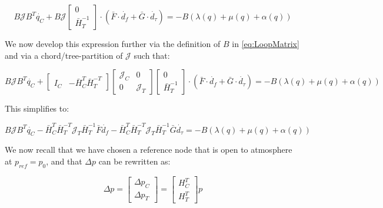 \begin{equation}\label{eq:PressureFunctionKirchKNL}
	B\mathcal{J}B^T\dot{q_C} + B \mathcal{J} 
	\begin{bmatrix} 0 \\ \bar{H}_T^{-1} \end{bmatrix} \cdot (\bar{F} \cdot \dot{d_f} + \bar{G} \cdot \dot{d_{\tau}})
	= -B(\lambda(q) + \mu(q) + \alpha(q))
\end{equation}

We now develop this expression further via the definition of $B$ in \cref{eq:LoopMatrix} and via a chord/tree-partition of $\mathcal{J}$ such that:

\begin{equation}\label{eq:PressureFunctionKirchJPartitions}
	B\mathcal{J}B^T\dot{q_C} + 
	\begin{bmatrix}		I_C & -\bar{H}_C^T\bar{H}_T^{-T}	\end{bmatrix} 
	\begin{bmatrix}		\mathcal{J}_C & 0 \\ 0 & \mathcal{J}_T	\end{bmatrix} 
	\begin{bmatrix} 0 \\ \bar{H}_T^{-1} \end{bmatrix} \cdot (\bar{F} \cdot \dot{d_f} + \bar{G} \cdot \dot{d_{\tau}})
	= -B(\lambda(q) + \mu(q) + \alpha(q))
\end{equation}

This simplifies to:

\begin{equation}\label{eq:PressureFunctionKirchJPartitionsSimp} %
	B\mathcal{J}B^T\dot{q_C} 
	-\bar{H}_C^T\bar{H}_T^{-T}\mathcal{J}_T\bar{H}_T^{-1} \bar{F} \dot{d_f} 
	-\bar{H}_C^T\bar{H}_T^{-T}\mathcal{J}_T\bar{H}_T^{-1} \bar{G} \dot{d_{\tau}}
	= -B(\lambda(q) + \mu(q) + \alpha(q))
\end{equation}

We now recall that we have chosen a reference node that is open to atmosphere at $p_{ref} = p_0$, and that $\Delta p$ can be rewritten as: 

\begin{equation}\label{eq:DeltaPPartition}
	\Delta p =
	\begin{bmatrix}		\Delta p_C \\ \Delta p_T	\end{bmatrix} = 
	\begin{bmatrix}		H_C^T \\ H_T^T	\end{bmatrix} p
\end{equation}

